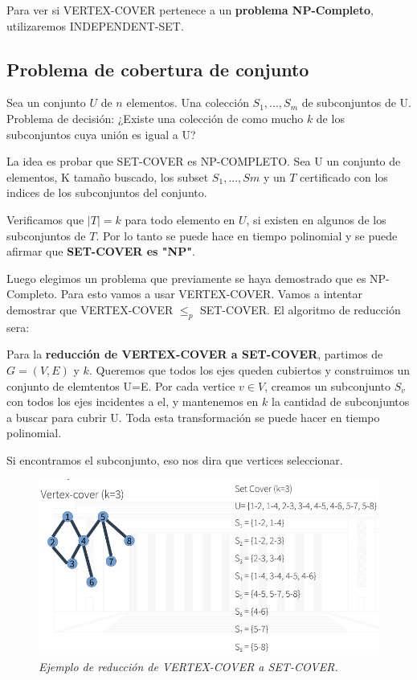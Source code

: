 \documentclass{article}
\begin{document}
Para ver si VERTEX-COVER pertenece a un \textbf{problema NP-Completo}, utilizaremos INDEPENDENT-SET.

\newpage
\subsection{Problema de cobertura de conjunto}

Sea un conjunto \(U\) de \(n\) elementos. Una colección \(S_1,...,S_m\) de subconjuntos de U. 
Problema de decisión: ¿Existe una colección de como mucho \(k\) de los subconjuntos cuya unión es igual a U?

La idea es probar que SET-COVER es NP-COMPLETO. Sea U un conjunto de elementos, 
K tamaño buscado, los subset \(S_1,...,Sm\) y un \(T\) certificado con los indices de los subconjuntos del conjunto.

Verificamos que \(|T|=k\) para todo elemento en \(U\), si existen en algunos de los subconjuntos de \(T\). 
Por lo tanto se puede hace en tiempo polinomial y se puede afirmar que \textbf{SET-COVER es "NP"}.

Luego elegimos un problema que previamente se haya demostrado que es NP-Completo. Para esto vamos a usar VERTEX-COVER.
Vamos a intentar demostrar que VERTEX-COVER \(\leq_p\) SET-COVER. El algoritmo de reducción sera:

\newpage
Para la \textbf{reducción de VERTEX-COVER a SET-COVER}, partimos de \(G=(V,E)\) y \(k\). Queremos que todos los ejes
queden cubiertos y construimos un conjunto de elemtentos U=E. Por cada vertice \(v \in V\), 
creamos un subconjunto \(S_v\) con todos los ejes incidentes a el, y mantenemos en \(k\) la cantidad
de subconjuntos a buscar para cubrir U. Toda esta transformación se puede hacer en tiempo polinomial.

Si encontramos el subconjunto, eso nos dira que vertices seleccionar.

\begin{figure}[h!]
    \begin{center} 
    \includegraphics[width=\linewidth]{imagenes/ejemplo-set-cover.png}
    \caption{\small \sl Ejemplo de reducción de VERTEX-COVER a SET-COVER.\label{fig:Stupendous}} 
    \end{center}
\end{figure}
\end{document}

